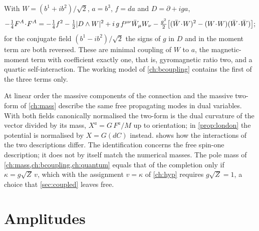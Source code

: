 \begin{proposition}
\label{prop:whatadds}
With $W=(b^1+ib^2)/\sqrt2$, $a=b^3$, $f=da$ and $D=\partial+iga$,
\[
-\tfrac14F^A\!\cdot\!F^A=-\tfrac14f^2-\half|D\wedge W|^2+i\,g\,f^{\mu\nu}\bar W_\mu W_\nu
-\tfrac{g^2}2\bigl[(\bar W\!\cdot\!W)^2-(W\!\cdot\!W)(\bar W\!\cdot\!\bar W)\bigr];
\]
for the conjugate field $(b^1-ib^2)/\sqrt2$ the signs of $g$ in $D$ and in the moment term are both reversed. These are minimal coupling of
$W$ to $a$, the magnetic-moment term with coefficient exactly one, that is, gyromagnetic ratio two, and a quartic self-interaction. The
working model of \cref{ch:bcoupling} contains the first of the three terms only.
\end{proposition}

At linear order the massive components of the connection and the massive two-form of \cref{ch:mass} describe the same free propagating
modes in dual variables. With both fields canonically normalised the two-form is the dual curvature of the vector divided by its mass,
$X^a=G\,F^a/M$ up to orientation; in \cref{prop:london} the potential is normalised by $X=G(dC)$ instead.  shows how the
interactions of the two descriptions differ. The identification concerns the free spin-one description; it does not by itself match the
numerical masses. The pole mass of \cref{ch:mass,ch:bcoupling,ch:quantum} equals that of the completion only if $\kappa=g\sqrt Z\,v$, which
with the assignment $v=\kappa$ of \cref{ch:hyp} requires $g\sqrt Z=1$, a choice that \cref{sec:coupled} leaves free.

\section{Amplitudes}

